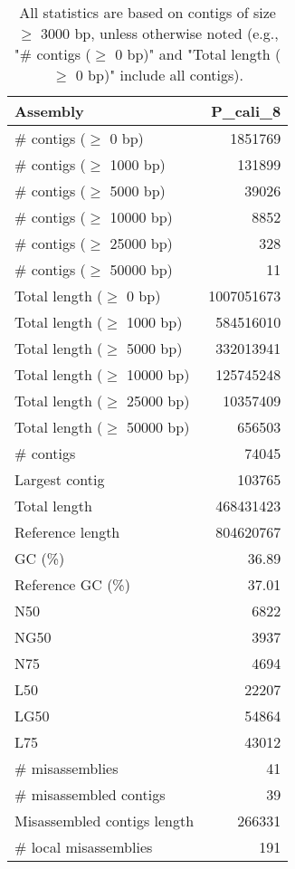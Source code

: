 \documentclass[12pt,a4paper]{article}
\begin{document}
\begin{table}[ht]
\begin{center}
\caption{All statistics are based on contigs of size $\geq$ 3000 bp, unless otherwise noted (e.g., "\# contigs ($\geq$ 0 bp)" and "Total length ($\geq$ 0 bp)" include all contigs).}
\begin{tabular}{|l*{1}{|r}|}
\hline
Assembly & P\_cali\_8 \\ \hline
\# contigs ($\geq$ 0 bp) & 1851769 \\ \hline
\# contigs ($\geq$ 1000 bp) & 131899 \\ \hline
\# contigs ($\geq$ 5000 bp) & 39026 \\ \hline
\# contigs ($\geq$ 10000 bp) & 8852 \\ \hline
\# contigs ($\geq$ 25000 bp) & 328 \\ \hline
\# contigs ($\geq$ 50000 bp) & 11 \\ \hline
Total length ($\geq$ 0 bp) & 1007051673 \\ \hline
Total length ($\geq$ 1000 bp) & 584516010 \\ \hline
Total length ($\geq$ 5000 bp) & 332013941 \\ \hline
Total length ($\geq$ 10000 bp) & 125745248 \\ \hline
Total length ($\geq$ 25000 bp) & 10357409 \\ \hline
Total length ($\geq$ 50000 bp) & 656503 \\ \hline
\# contigs & 74045 \\ \hline
Largest contig & 103765 \\ \hline
Total length & 468431423 \\ \hline
Reference length & 804620767 \\ \hline
GC (\%) & 36.89 \\ \hline
Reference GC (\%) & 37.01 \\ \hline
N50 & 6822 \\ \hline
NG50 & 3937 \\ \hline
N75 & 4694 \\ \hline
L50 & 22207 \\ \hline
LG50 & 54864 \\ \hline
L75 & 43012 \\ \hline
\# misassemblies & 41 \\ \hline
\# misassembled contigs & 39 \\ \hline
Misassembled contigs length & 266331 \\ \hline
\# local misassemblies & 191 \\ \hline

\end{tabular}
\end{center}
\end{table}
\end{document}
